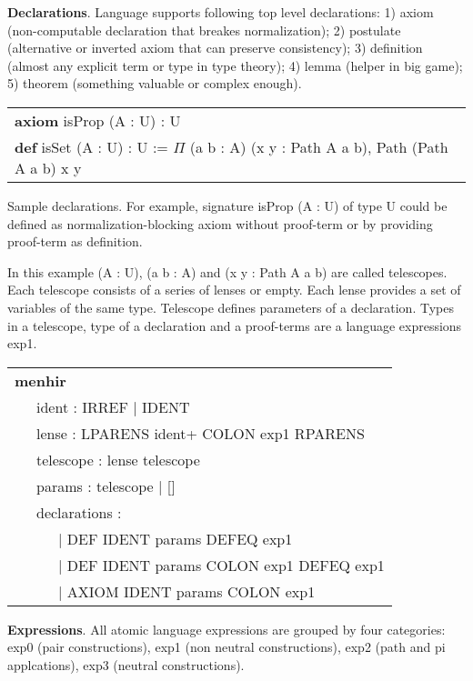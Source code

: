 \documentclass[a4paper,UKenglish,cleveref, autoref, thm-restate]{lipics-v2021}
\newcommand{\tabstyle}[0]{\scriptsize\ttfamily\fontseries{l}\selectfont}
\begin{document}
\textbf{Declarations}. Language supports following top level declarations:
1) axiom (non-computable declaration that breakes normalization);
2) postulate (alternative or inverted axiom that can preserve consistency);
3) definition (almost any explicit term or type in type theory);
4) lemma (helper in big game);
5) theorem (something valuable or complex enough).

\begin{table}[ht!]
\tabstyle
\begin{tabular}{l}
\textbf{axiom} isProp (A : U) : U \\
\textbf{def} isSet (A : U) : U := \textbf{$\Pi$} (a b : A) (x y : Path A a b), Path (Path A a b) x y
\end{tabular}
\end{table}

Sample declarations. For example, signature isProp (A : U) of type U could be
defined as normalization-blocking axiom without proof-term or by providing proof-term as definition.

In this example (A : U), (a b : A) and (x y : Path A a b) are called telescopes.
Each telescope consists of a series of lenses or empty. Each lense provides a
set of variables of the same type. Telescope defines parameters of a declaration.
Types in a telescope, type of a declaration and a proof-terms are a language expressions exp1.

\begin{table}[ht]
\tabstyle
\begin{tabular}{l}
\textbf{menhir} \\
\ \ \ ident : IRREF | IDENT \\
\ \ \ lense : LPARENS ident+ COLON exp1 RPARENS \\
\ \ \ telescope : lense telescope \\
\ \ \ params : telescope | [] \\
\ \ \ declarations : \\
\ \ \ \ \ \ | DEF IDENT params DEFEQ exp1 \\
\ \ \ \ \ \ | DEF IDENT params COLON exp1 DEFEQ exp1 \\
\ \ \ \ \ \ | AXIOM IDENT params COLON exp1
\end{tabular}
\end{table}

\textbf{Expressions}. All atomic language expressions are grouped by four categories:
exp0 (pair constructions), exp1 (non neutral constructions), exp2 (path and pi applcations),
exp3 (neutral constructions).
\end{document}
